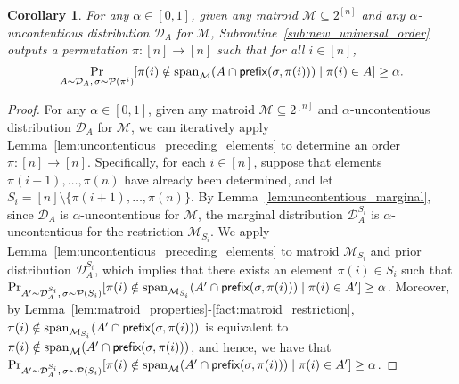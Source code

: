 \documentclass[11pt]{article}
\newcommand{\D}{\mathcal D}
\newcommand{\M}{{\mathcal M}}
\newcommand{\cP}{\mathcal P}
\newcommand{\pref}{\textnormal{\sffamily prefix}}
\newcommand{\spa}{\textnormal{span}}
\newtheorem{corollary}[theorem]{Corollary}
\begin{document}
\begin{corollary}\label{cor:preceding_elements}
For any $\alpha\in[0,1]$, given any matroid $\M\subseteq 2^{[n]}$ and any $\alpha$-uncontentious distribution $\D_A$ for $\M$, Subroutine~\ref{sub:new_universal_order} outputs a permutation $\pi:[n]\to[n]$ such that for all $i\in[n]$, 
\begin{equation}\label{eq:uncontentious_preceding_elements}
    \Pr_{A\sim\D_A,\,\sigma\sim\cP(\pi^i)}[\pi(i) \notin\spa_{\M}(A\cap\pref(\sigma,\pi(i)))\mid \pi(i)\in A]\ge \alpha.
\end{equation}
\end{corollary}
\begin{proof}
For any $\alpha\in[0,1]$, given any matroid $\M\subseteq2^{[n]}$ and $\alpha$-uncontentious distribution $\D_A$ for $\M$, we can iteratively apply Lemma~\ref{lem:uncontentious_preceding_elements} to determine an order $\pi:[n]\to[n]$. Specifically, for each $i\in[n]$, suppose that elements $\pi(i+1),\dots,\pi(n)$ have already been determined, and let $S_i=[n]\setminus\{\pi(i+1),\dots,\pi(n)\}$. By Lemma~\ref{lem:uncontentious_marginal}, since $\D_A$ is $\alpha$-uncontentious for $\M$, the marginal distribution $\D_A^{S_i}$ is $\alpha$-uncontentious for the restriction $\M_{S_i}$. We apply Lemma~\ref{lem:uncontentious_preceding_elements} to matroid $\M_{S_i}$ and prior distribution $\D_A^{S_i}$, which implies that there exists an element $\pi(i)\in S_i$ such that ${\Pr}_{A'\sim \D_A^{S_i},\,\sigma\sim\cP(S_i)}[\pi(i)\notin\spa_{\M_{S_i}}(A'\cap\pref(\sigma,\pi(i)))\mid \pi(i)\in A']\ge \alpha$. Moreover, by Lemma~\ref{lem:matroid_properties}-\ref{fact:matroid_restriction}, $\pi(i)\notin \spa_{\M_{S_i}}(A'\cap\pref(\sigma,\pi(i)))$ is equivalent to $\pi(i)\notin \spa_{\M}(A'\cap\pref(\sigma,\pi(i)))$, and hence, we have that $\Pr_{A'\sim\D_A^{S_i},\,\sigma\sim\cP(S_i)}[\pi(i)\notin\spa_{\M}(A'\cap\pref(\sigma,\pi(i)))\mid \pi(i)\in A']\ge \alpha$.


\end{proof}
\end{document}
